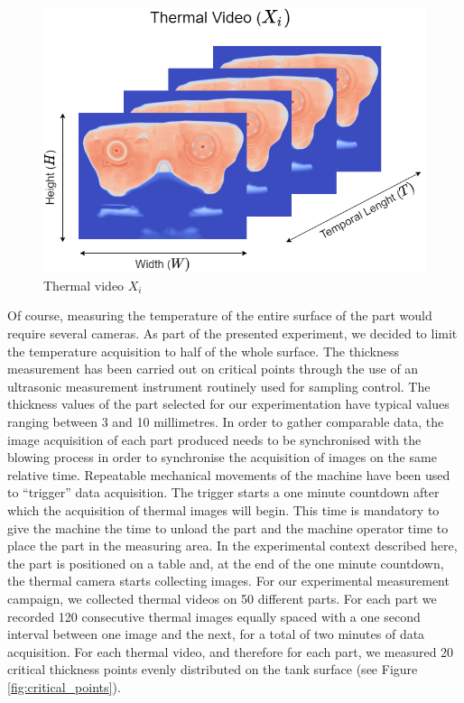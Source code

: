 \begin{figure}
\centering
\includegraphics[scale=0.55]{images/chapter_4/Thermal_video.png}
\caption{Thermal video $X_i$}
\label{fig:thermal_video}
\end{figure}

Of course, measuring the temperature of the entire surface of the part would require several cameras. As part of the presented experiment, we decided to limit the temperature acquisition to half of the whole surface. The thickness measurement has been carried out on critical points through the use of an ultrasonic measurement instrument routinely used for sampling control. The thickness values of the part selected for our experimentation have typical values ranging between 3 and 10 millimetres. In order to gather comparable data, the image acquisition of each part produced needs to be synchronised with the blowing process in order to synchronise the  acquisition of images on the same relative time. Repeatable mechanical movements of the machine have been used to “trigger” data acquisition. The trigger starts a one minute countdown after which the acquisition of thermal images will begin. This time is mandatory to give the machine the time to unload the part and the machine operator time to place the part in the measuring area. In the experimental context described here, the part is positioned on a table and, at the end of the one minute countdown, the thermal camera starts collecting images. For our experimental measurement campaign, we collected thermal videos on 50 different parts. For each part we recorded 120 consecutive thermal images equally spaced  with a one second interval between one image and the next, for a total of two minutes of data acquisition. For each thermal video, and therefore for each part, we measured 20 critical thickness points evenly distributed on the tank surface (see Figure \ref{fig:critical_points}). 

